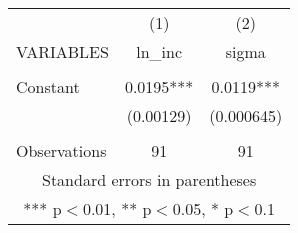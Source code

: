 \begin{tabular}{lcc} \hline
 & (1) & (2) \\
VARIABLES & ln\_inc & sigma \\ \hline
 &  &  \\
Constant & 0.0195*** & 0.0119*** \\
 & (0.00129) & (0.000645) \\
 &  &  \\
 Observations & 91 & 91 \\ \hline
\multicolumn{3}{c}{ Standard errors in parentheses} \\
\multicolumn{3}{c}{ *** p$<$0.01, ** p$<$0.05, * p$<$0.1} \\
\end{tabular}

